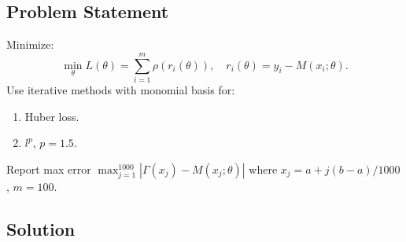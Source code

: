 \documentclass[a4paper,12pt]{article}
\begin{document}
\subsection*{Problem Statement}
Minimize:
\[
\min_{\theta} L(\theta) = \sum_{i=1}^m \rho(r_i(\theta)), \quad r_i(\theta) = y_i - M(x_i; \theta).
\]
Use iterative methods with monomial basis for:
\begin{enumerate}
    \item Huber loss.
    \item \( l^p \), \( p = 1.5 \).
\end{enumerate}
Report max error \( \max_{j=1}^{1000} | \Gamma(x_j) - M(x_j; \theta) | \) where \( x_j = a + j (b - a) / 1000 \), \( m = 100 \).

\subsection*{Solution}
\end{document}
